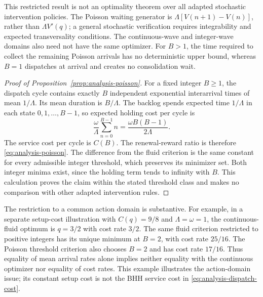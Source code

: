 This restricted result is not an optimality theorem over all adapted
stochastic intervention policies. The Poisson waiting generator is
$\Lambda[V(n+1)-V(n)]$, rather than $\Lambda V'(q)$; a general stochastic
verification requires integrability and expected transversality conditions.
The continuous-wave and integer-wave domains also need not have the same
optimizer. For $B>1$, the time required to collect the remaining Poisson
arrivals has no deterministic upper bound, whereas $B=1$ dispatches at
arrival and creates no consolidation wait.

\begin{proof}[Proof of Proposition~\ref{prop:analysis-poisson}]
For a fixed integer $B\ge1$, the dispatch cycle contains exactly $B$
independent exponential interarrival times of mean $1/\Lambda$. Its
mean duration is $B/\Lambda$. The backlog spends expected time
$1/\Lambda$ in each state $0,1,\ldots,B-1$, so expected holding cost
per cycle is
\[
 \frac\omega\Lambda\sum_{n=0}^{B-1}n
       =\frac{\omega B(B-1)}{2\Lambda}.
\]
The service cost per cycle is $C(B)$. The renewal-reward ratio is
therefore \eqref{eq:analysis-poisson}. The difference from the fluid
criterion is the same constant for every admissible integer threshold,
which preserves its minimizer set. Both integer minima exist, since
the holding term tends to infinity with $B$. This calculation proves
the claim within the stated threshold class and makes no comparison
with other adapted intervention rules.
\end{proof}

The restriction to a common action domain is substantive. For example,
in a separate setup-cost illustration with $C(q)=9/8$ and
$\Lambda=\omega=1$, the continuous-fluid optimum is $q=3/2$ with cost
rate $3/2$. The same fluid criterion restricted to positive integers
has its unique minimum at $B=2$, with cost rate $25/16$. The Poisson
threshold criterion also chooses $B=2$ and has cost rate $17/16$.
Thus equality of mean arrival rates alone implies neither equality
with the continuous optimizer nor equality of cost rates. This example
illustrates the action-domain issue; its constant setup cost is not
the BHH service cost in \eqref{eq:analysis-dispatch-cost}.

